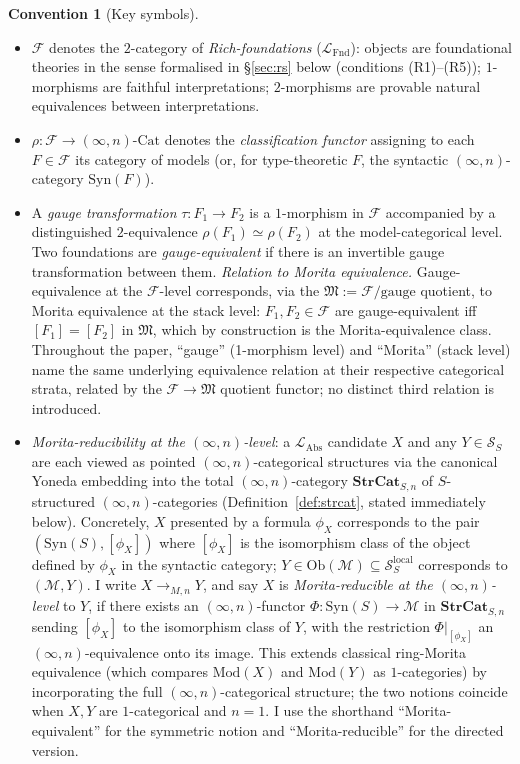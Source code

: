 \documentclass[11pt]{article}
\theoremstyle{plain}
\theoremstyle{definition}
\newtheorem{convention}[theorem]{Convention}
\newcommand{\cS}{\mathcal{S}}
\newcommand{\cF}{\mathcal{F}}
\newcommand{\cM}{\mathcal{M}}
\newcommand{\fM}{\mathfrak{M}}
\newcommand{\LFnd}{\mathcal{L}_{\mathrm{Fnd}}}
\newcommand{\LAbs}{\mathcal{L}_{\mathrm{Abs}}}
\newcommand{\Ob}{\mathrm{Ob}}
\newcommand{\Cat}{\mathrm{Cat}}
\newcommand{\Syn}{\mathrm{Syn}}
\newcommand{\Mod}{\mathrm{Mod}}
\begin{document}
\begin{convention}[Key symbols]\label{conv:notation}
\begin{itemize}
\item $\cF$ denotes the $2$-category of \emph{Rich-foundations} ($\LFnd$): objects are foundational theories in the sense formalised in \S\ref{sec:rs} below (conditions (R1)--(R5)); $1$-morphisms are faithful interpretations; $2$-morphisms are provable natural equivalences between interpretations.
\item $\rho : \cF \to (\infty, n)\text{-}\Cat$ denotes the \emph{classification functor} assigning to each $F \in \cF$ its category of models (or, for type-theoretic $F$, the syntactic $(\infty, n)$-category $\Syn(F)$).
\item A \emph{gauge transformation} $\tau : F_1 \to F_2$ is a $1$-morphism in $\cF$ accompanied by a distinguished $2$-equivalence $\rho(F_1) \simeq \rho(F_2)$ at the model-categorical level. Two foundations are \emph{gauge-equivalent} if there is an invertible gauge transformation between them. \emph{Relation to Morita equivalence.} Gauge-equivalence at the $\cF$-level corresponds, via the $\fM := \cF/\text{gauge}$ quotient, to Morita equivalence at the stack level: $F_1, F_2 \in \cF$ are gauge-equivalent iff $[F_1] = [F_2]$ in $\fM$, which by construction is the Morita-equivalence class. Throughout the paper, ``gauge'' (1-morphism level) and ``Morita'' (stack level) name the same underlying equivalence relation at their respective categorical strata, related by the $\cF \to \fM$ quotient functor; no distinct third relation is introduced.
\item \emph{Morita-reducibility at the $(\infty, n)$-level}: a $\LAbs$ candidate $X$ and any $Y \in \cS_S$ are each viewed as pointed $(\infty, n)$-categorical structures via the canonical Yoneda embedding into the total $(\infty, n)$-category $\mathbf{StrCat}_{S, n}$ of $S$-structured $(\infty, n)$-categories (Definition~\ref{def:strcat}, stated immediately below). Concretely, $X$ presented by a formula $\phi_X$ corresponds to the pair $(\Syn(S), [\phi_X])$ where $[\phi_X]$ is the isomorphism class of the object defined by $\phi_X$ in the syntactic category; $Y \in \Ob(\cM) \subseteq \cS_S^{\mathrm{local}}$ corresponds to $(\cM, Y)$. I write $X \to_{M, n} Y$, and say $X$ is \emph{Morita-reducible at the $(\infty, n)$-level} to $Y$, if there exists an $(\infty, n)$-functor $\Phi : \Syn(S) \to \cM$ in $\mathbf{StrCat}_{S, n}$ sending $[\phi_X]$ to the isomorphism class of $Y$, with the restriction $\Phi |_{[\phi_X]}$ an $(\infty, n)$-equivalence onto its image. This extends classical ring-Morita equivalence (which compares $\Mod(X)$ and $\Mod(Y)$ as $1$-categories) by incorporating the full $(\infty, n)$-categorical structure; the two notions coincide when $X, Y$ are $1$-categorical and $n = 1$. I use the shorthand ``Morita-equivalent'' for the symmetric notion and ``Morita-reducible'' for the directed version.

\end{itemize}
\end{convention}
\end{document}
